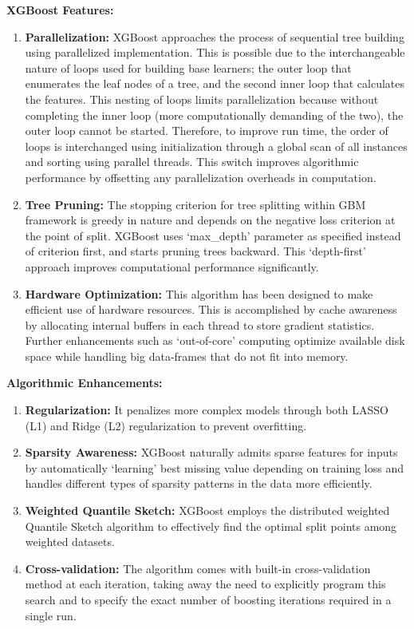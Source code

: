         \textbf{XGBoost Features: }
        \begin{enumerate}
            \item \textbf{Parallelization:} XGBoost approaches the process of sequential tree building using parallelized implementation. This is possible due to the interchangeable nature of loops used for building base learners; the outer loop that enumerates the leaf nodes of a tree, and the second inner loop that calculates the features. This nesting of loops limits parallelization because without completing the inner loop (more computationally demanding of the two), the outer loop cannot be started. Therefore, to improve run time, the order of loops is interchanged using initialization through a global scan of all instances and sorting using parallel threads. This switch improves algorithmic performance by offsetting any parallelization overheads in computation.
            \item \textbf{Tree Pruning:} The stopping criterion for tree splitting within GBM framework is greedy in nature and depends on the negative loss criterion at the point of split. XGBoost uses ‘max\_depth’ parameter as specified instead of criterion first, and starts pruning trees backward. This ‘depth-first’ approach improves computational performance significantly.
            \item \textbf{Hardware Optimization:} This algorithm has been designed to make efficient use of hardware resources. This is accomplished by cache awareness by allocating internal buffers in each thread to store gradient statistics. Further enhancements such as ‘out-of-core’ computing optimize available disk space while handling big data-frames that do not fit into memory.
        \end{enumerate}

        \textbf{Algorithmic Enhancements:}
        \begin{enumerate}
            \item \textbf{Regularization:} It penalizes more complex models through both LASSO (L1) and Ridge (L2) regularization to prevent overfitting.
            \item \textbf{Sparsity Awareness:} XGBoost naturally admits sparse features for inputs by automatically ‘learning’ best missing value depending on training loss and handles different types of sparsity patterns in the data more efficiently.
            \item \textbf{Weighted Quantile Sketch:} XGBoost employs the distributed weighted Quantile Sketch algorithm to effectively find the optimal split points among weighted datasets.
            \item \textbf{Cross-validation:} The algorithm comes with built-in cross-validation method at each iteration, taking away the need to explicitly program this search and to specify the exact number of boosting iterations required in a single run.
        \end{enumerate}

\newpage